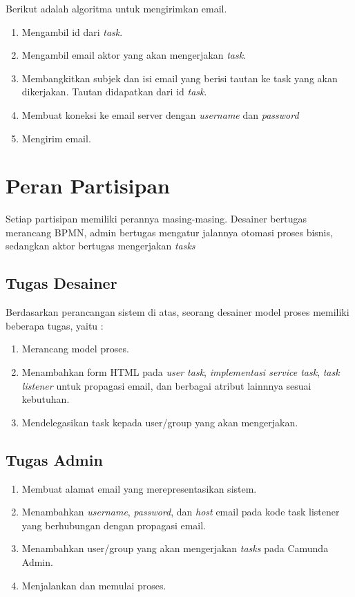 Berikut adalah algoritma untuk mengirimkan email.
\begin{enumerate}
	\item Mengambil id dari \textit{task}.
	\item Mengambil email aktor yang akan mengerjakan \textit{task}.
	\item Membangkitkan subjek dan isi email yang berisi tautan ke task yang akan dikerjakan. Tautan didapatkan dari id \textit{task}.
	\item Membuat koneksi ke email server dengan \textit{username} dan \textit{password}
	\item Mengirim email.
\end{enumerate}


\section{Peran Partisipan}
\label{peranpartisipan}
Setiap partisipan memiliki perannya masing-masing. Desainer bertugas merancang BPMN, admin bertugas mengatur jalannya otomasi proses bisnis, sedangkan aktor bertugas mengerjakan \textit{tasks}
\subsection{Tugas Desainer}
\label{tugasdesainer}
Berdasarkan perancangan sistem di atas, seorang desainer model proses memiliki beberapa tugas, yaitu :
\begin{enumerate}
	\item Merancang model proses.
	\item Menambahkan form HTML pada \textit{user task}, \textit{implementasi service task}, \textit{task listener} untuk propagasi email, dan berbagai atribut lainnnya sesuai kebutuhan.
	\item Mendelegasikan task kepada user/group yang akan mengerjakan.
\end{enumerate}

\subsection{Tugas Admin}	
\label{tugasadmin}
\begin{enumerate}
	\item Membuat alamat email yang merepresentasikan sistem.
	\item Menambahkan \textit{username}, \textit{password}, dan \textit{host} email pada kode task listener yang berhubungan dengan propagasi email.
	\item Menambahkan user/group yang akan mengerjakan \textit{tasks} pada Camunda Admin.
	\item Menjalankan dan memulai proses.
\end{enumerate}

